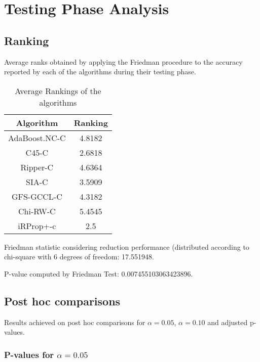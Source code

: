 \documentclass[a4paper,10pt]{article}
\begin{document}
\pagebreak

\section{Testing Phase Analysis}


\subsection {Ranking}
Average ranks obtained by applying the Friedman procedure to the accuracy reported by each of the algorithms during their testing phase.

\begin{table}[!htp]
\centering
\begin{tabular}{|c|c|}\hline
Algorithm&Ranking\\\hline
AdaBoost.NC-C & 4.8182\\
C45-C & 2.6818\\
Ripper-C & 4.6364\\
SIA-C & 3.5909\\
GFS-GCCL-C & 4.3182\\
Chi-RW-C & 5.4545\\
iRProp+-c & 2.5\\
\hline
\end{tabular}
\caption{Average Rankings of the algorithms}
\end{table}

Friedman statistic considering reduction performance (distributed according to chi-square with 6 degrees of freedom: 17.551948.

P-value computed by Friedman Test: 0.007455103063423896.\newline



\pagebreak

\subsection{Post hoc comparisons}

Results achieved on post hoc comparisons for $\alpha = 0.05$, $\alpha = 0.10$ and adjusted p-values.

\subsubsection{P-values for $\alpha=0.05$}
\end{document}

